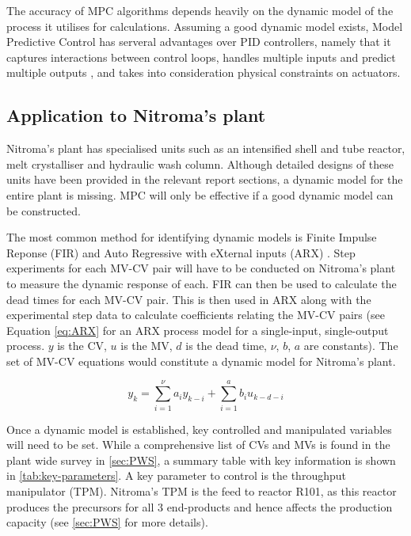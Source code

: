 The accuracy of MPC algorithms depends heavily on the dynamic model of the process it utilises for calculations. Assuming a good dynamic model exists, Model Predictive Control has serveral advantages over PID controllers, namely that it captures interactions between control loops, handles multiple inputs and predict multiple outputs \cite{seborg_process_2011}, and takes into consideration physical constraints on actuators. 

\subsection{Application to Nitroma's plant}
Nitroma's plant has specialised units such as an intensified shell and tube reactor, melt crystalliser and hydraulic wash column. Although detailed designs of these units have been provided in the relevant report sections, a dynamic model for the entire plant is missing. MPC will only be effective if a good dynamic model can be constructed. 

The most common method for identifying dynamic models is Finite Impulse Reponse (FIR) and Auto Regressive with eXternal inputs (ARX) . Step experiments for each MV-CV pair will have to be conducted on Nitroma's plant to measure the dynamic response of each. FIR can then be used to calculate the dead times for each MV-CV pair. This is then used in ARX along with the experimental step data to calculate coefficients relating the MV-CV pairs (see Equation \ref{eq:ARX} for an ARX process model for a single-input, single-output process. $y$ is the CV, $u$ is the MV, $d$ is the dead time, $\nu$, $b$, $a$ are constants). The set of MV-CV equations would constitute a dynamic model for Nitroma's plant. 

\begin{equation} \label{eq:ARX}
    y_k = \sum_{i=1}^{\nu}a_{i}y_{k-i} + \sum_{i=1}^{a}b_{i}u_{k-d-i}
\end{equation}

Once a dynamic model is established, key controlled and manipulated variables will need to be set. While a comprehensive list of CVs and MVs is found in the plant wide survey in \ref{sec:PWS}, a summary table with key information is shown in \cref{tab:key-parameters}. A key parameter to control is the throughput manipulator (TPM). Nitroma's TPM is the feed to reactor R101, as this reactor produces the precursors for all 3 end-products and hence affects the production capacity (see \ref{sec:PWS} for more details).  

